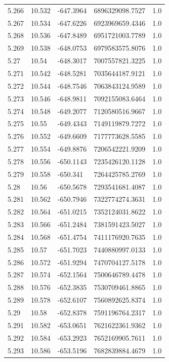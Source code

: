 \begin{tabular}{lllll}
5.266 & 10.532 & -647.3964 & 6896329098.7527 & 1.0 \\
5.267 & 10.534 & -647.6226 & 6923969659.4346 & 1.0 \\
5.268 & 10.536 & -647.8489 & 6951721003.7789 & 1.0 \\
5.269 & 10.538 & -648.0753 & 6979583575.8076 & 1.0 \\
5.27 & 10.54 & -648.3017 & 7007557821.3225 & 1.0 \\
5.271 & 10.542 & -648.5281 & 7035644187.9121 & 1.0 \\
5.272 & 10.544 & -648.7546 & 7063843124.9589 & 1.0 \\
5.273 & 10.546 & -648.9811 & 7092155083.6464 & 1.0 \\
5.274 & 10.548 & -649.2077 & 7120580516.9667 & 1.0 \\
5.275 & 10.55 & -649.4343 & 7149119879.7272 & 1.0 \\
5.276 & 10.552 & -649.6609 & 7177773628.5585 & 1.0 \\
5.277 & 10.554 & -649.8876 & 7206542221.9209 & 1.0 \\
5.278 & 10.556 & -650.1143 & 7235426120.1128 & 1.0 \\
5.279 & 10.558 & -650.341 & 7264425785.2769 & 1.0 \\
5.28 & 10.56 & -650.5678 & 7293541681.4087 & 1.0 \\
5.281 & 10.562 & -650.7946 & 7322774274.3631 & 1.0 \\
5.282 & 10.564 & -651.0215 & 7352124031.8622 & 1.0 \\
5.283 & 10.566 & -651.2484 & 7381591423.5027 & 1.0 \\
5.284 & 10.568 & -651.4754 & 7411176920.7635 & 1.0 \\
5.285 & 10.57 & -651.7023 & 7440880997.0133 & 1.0 \\
5.286 & 10.572 & -651.9294 & 7470704127.5178 & 1.0 \\
5.287 & 10.574 & -652.1564 & 7500646789.4478 & 1.0 \\
5.288 & 10.576 & -652.3835 & 7530709461.8865 & 1.0 \\
5.289 & 10.578 & -652.6107 & 7560892625.8374 & 1.0 \\
5.29 & 10.58 & -652.8378 & 7591196764.2317 & 1.0 \\
5.291 & 10.582 & -653.0651 & 7621622361.9362 & 1.0 \\
5.292 & 10.584 & -653.2923 & 7652169905.7611 & 1.0 \\
5.293 & 10.586 & -653.5196 & 7682839884.4679 & 1.0 \\

\end{tabular}
